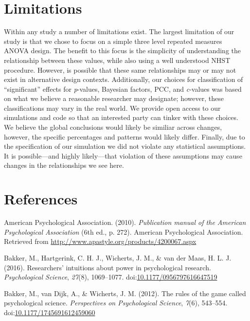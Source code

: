 \documentclass[english,man]{apa6}
\theoremstyle{definition}
\theoremstyle{definition}
\theoremstyle{definition}
\theoremstyle{remark}
\begin{document}
\section{Limitations}\label{limitations}

Within any study a number of limitations exist. The largest limitation
of our study is that we chose to focus on a simple three level repeated
measures ANOVA design. The benefit to this focus is the simplicity of
understanding the relationship between these values, while also using a
well understood NHST procedure. However, is possible that these same
relationships may or may not exist in alternative design contexts.
Additionally, our choices for classification of \enquote{significant}
effects for \emph{p}-values, Bayesian factors, PCC, and \emph{c}-values
was based on what we believe a reasonable researcher may designate;
however, these classifications may vary in the real world. We provide
open access to our simulations and code so that an interested party can
tinker with these choices. We believe the global conclusions would
likely be similiar across changes, however, the specific percentages and
patterns would likely differ. Finally, due to the specification of our
simulation we did not violate any statistical assumptions. It is
possible---and highly likely---that violation of these assumptions may
cause changes in the relationships we see here. \newpage

\section{References}\label{references}

\setlength{\parindent}{-0.5in} \setlength{\leftskip}{0.5in}

\hypertarget{refs}{}
\hypertarget{ref-AmericanPsychologicalAssociation2010}{}
American Psychological Association. (2010). \emph{Publication manual of
the American Psychological Association} (6th ed., p. 272). American
Psychological Association. Retrieved from
\url{http://www.apastyle.org/products/4200067.aspx}

\hypertarget{ref-Bakker2016}{}
Bakker, M., Hartgerink, C. H. J., Wicherts, J. M., \& van der Maas, H.
L. J. (2016). Researchers' intuitions about power in psychological
research. \emph{Psychological Science}, \emph{27}(8), 1069--1077.
doi:\href{https://doi.org/10.1177/0956797616647519}{10.1177/0956797616647519}

\hypertarget{ref-Bakker2012}{}
Bakker, M., van Dijk, A., \& Wicherts, J. M. (2012). The rules of the
game called psychological science. \emph{Perspectives on Psychological
Science}, \emph{7}(6), 543--554.
doi:\href{https://doi.org/10.1177/1745691612459060}{10.1177/1745691612459060}
\end{document}
